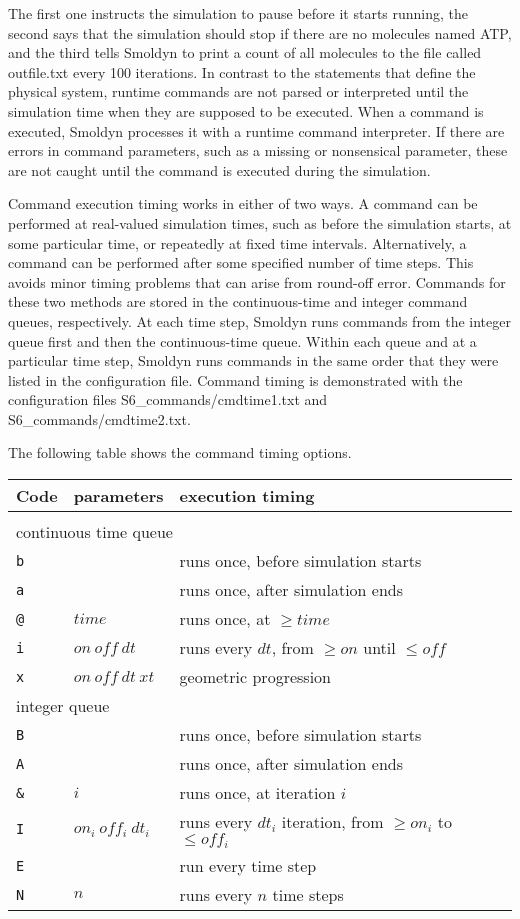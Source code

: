 \documentclass {scrbook}
\newcommand {\ttt} {\texttt}
\begin{document}
The first one instructs the simulation to pause before it starts running, the second says that the simulation should stop if there are no molecules named ATP, and the third tells Smoldyn to print a count of all molecules to the file called outfile.txt every 100 iterations. In contrast to the statements that define the physical system, runtime commands are not parsed or interpreted until the simulation time when they are supposed to be executed. When a command is executed, Smoldyn processes it with a runtime command interpreter. If there are errors in command parameters, such as a missing or nonsensical parameter, these are not caught until the command is executed during the simulation.

Command execution timing works in either of two ways. A command can be performed at real-valued simulation times, such as before the simulation starts, at some particular time, or repeatedly at fixed time intervals. Alternatively, a command can be performed after some specified number of time steps. This avoids minor timing problems that can arise from round-off error. Commands for these two methods are stored in the continuous-time and integer command queues, respectively. At each time step, Smoldyn runs commands from the integer queue first and then the continuous-time queue. Within each queue and at a particular time step, Smoldyn runs commands in the same order that they were listed in the configuration file. Command timing is demonstrated with the configuration files S6\_commands/cmdtime1.txt and S6\_commands/cmdtime2.txt.

The following table shows the command timing options.

\begin{longtable}[c]{lll}
Code & parameters & execution timing\\
\hline\\
\multicolumn{3}{l}{continuous time queue}\\
\ttt{b} &  & runs once, before simulation starts\\
\ttt{a} &  & runs once, after simulation ends\\
\ttt{@} & $time$ & runs once, at $\geq time$\\
\ttt{i} & $on\ off\ dt$ & runs every $dt$, from $\geq on$ until $\leq off$\\
\ttt{x} & $on\ off\ dt\ xt$ & geometric progression\\
\multicolumn{3}{l}{integer queue}\\
\ttt{B} &  & runs once, before simulation starts\\
\ttt{A} &  & runs once, after simulation ends\\
\ttt{\&} & $i$ & runs once, at iteration $i$\\
\ttt{I} & $on_i\ off_i\ dt_i$ & runs every $dt_i$ iteration, from $\geq on_i$ to $\leq off_i$\\
\ttt{E} &  & run every time step\\
\ttt{N} & $n$ & runs every $n$ time steps
\end{longtable}
\end{document}
